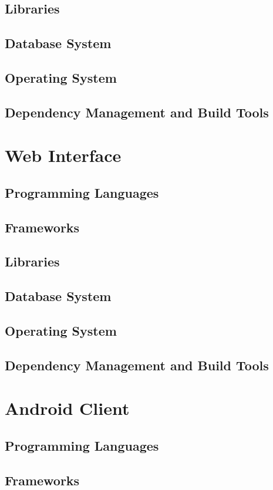 \documentclass[11pt,fleqn]{book} %
\begin{document}
		\subsection{Libraries}
		\subsection{Database System}
		\subsection{Operating System}
		\subsection{Dependency Management and Build Tools}
	\section{Web Interface}
		\subsection{Programming Languages}
		\subsection{Frameworks}
		\subsection{Libraries}
		\subsection{Database System}
		\subsection{Operating System}
		\subsection{Dependency Management and Build Tools}
	\section{Android Client}
		\subsection{Programming Languages}
		\subsection{Frameworks}
\end{document}
